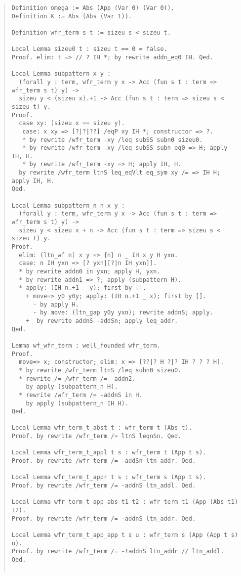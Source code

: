 \documentclass[12pt, titlepage]{ltjsarticle}
\begin{document}
\begin{quote}
\begin{verbatim}
Definition omega := Abs (App (Var 0) (Var 0)).
Definition K := Abs (Abs (Var 1)).

Definition wfr_term s t := sizeu s < sizeu t.

Local Lemma sizeu0 t : sizeu t == 0 = false.
Proof. elim: t => // ? IH *; by rewrite addn_eq0 IH. Qed.

Local Lemma subpattern x y :
  (forall y : term, wfr_term y x -> Acc (fun s t : term => wfr_term s t) y) ->
  sizeu y < (sizeu x).+1 -> Acc (fun s t : term => sizeu s < sizeu t) y.
Proof.
  case xy: (sizeu x == sizeu y).
   case: x xy => [?|?|??] /eqP xy IH *; constructor => ?.
   * by rewrite /wfr_term -xy /leq subSS subn0 sizeu0.
   * by rewrite /wfr_term -xy /leq subSS subn_eq0 => H; apply IH, H.
   * by rewrite /wfr_term -xy => H; apply IH, H.
  by rewrite /wfr_term ltnS leq_eqVlt eq_sym xy /= => IH H; apply IH, H.
Qed.

Local Lemma subpattern_n n x y :
  (forall y : term, wfr_term y x -> Acc (fun s t : term => wfr_term s t) y) ->
  sizeu y < sizeu x + n -> Acc (fun s t : term => sizeu s < sizeu t) y.
Proof.
  elim: (ltn_wf n) x y => {n} n _ IH x y H yxn.
  case: n IH yxn => [? yxn|[?|n IH yxn]].
  * by rewrite addn0 in yxn; apply H, yxn.
  * by rewrite addn1 => ?; apply (subpattern H).
  * apply: (IH n.+1 _ y); first by [].
    + move=> y0 y0y; apply: (IH n.+1 _ x); first by [].
      - by apply H.
      - by move: (ltn_gap y0y yxn); rewrite addnS; apply.
    +  by rewrite addnS -addSn; apply leq_addr.
Qed.

Lemma wf_wfr_term : well_founded wfr_term.
Proof.
  move=> x; constructor; elim: x => [??|? H ?|? IH ? ? ? H].
  * by rewrite /wfr_term ltnS /leq subn0 sizeu0.
  * rewrite /= /wfr_term /= -addn2.
    by apply (subpattern_n H).
  * rewrite /wfr_term /= -addnS in H.
    by apply (subpattern_n IH H).
Qed.

Local Lemma wfr_term_t_abst t : wfr_term t (Abs t).
Proof. by rewrite /wfr_term /= ltnS leqnSn. Qed.

Local Lemma wfr_term_t_appl t s : wfr_term t (App t s).
Proof. by rewrite /wfr_term /= -addSn ltn_addr. Qed.

Local Lemma wfr_term_t_appr t s : wfr_term s (App t s).
Proof. by rewrite /wfr_term /= -addnS ltn_addl. Qed.

Local Lemma wfr_term_t_app_abs t1 t2 : wfr_term t1 (App (Abs t1) t2).
Proof. by rewrite /wfr_term /= -addnS ltn_addr. Qed.

Local Lemma wfr_term_t_app_app t s u : wfr_term s (App (App t s) u).
Proof. by rewrite /wfr_term /= -!addnS ltn_addr // ltn_addl. Qed.


\end{verbatim}
\end{quote}
\end{document}
